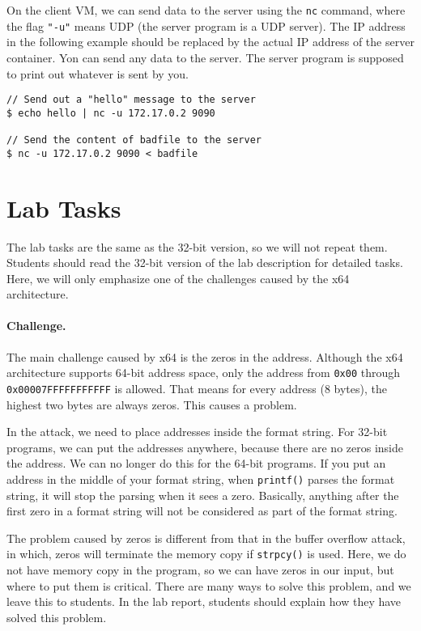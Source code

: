 On the client VM, we can send data to the server using 
the \texttt{nc} command, where the flag \texttt{"-u"} means UDP (the server
program is a UDP server). The IP address in the following example should be 
replaced by the actual IP address of the server container. 
Yon can send any data to the server. The server program is supposed
to print out whatever is sent by you. 


\begin{lstlisting}
// Send out a "hello" message to the server
$ echo hello | nc -u 172.17.0.2 9090 

// Send the content of badfile to the server
$ nc -u 172.17.0.2 9090 < badfile
\end{lstlisting}


 




\section{Lab Tasks}


The lab tasks are the same as the 32-bit version, so we will not 
repeat them. Students should read the 32-bit version of the 
lab description for detailed tasks. Here, we will
only emphasize one of the challenges caused by
the x64 architecture. 


\paragraph{Challenge.} The main challenge caused by x64 is the zeros in the address.
Although the x64 architecture
supports 64-bit address space, only the address from
\texttt{0x00} through \texttt{0x00007FFFFFFFFFFF} is allowed. That means for
every address (8 bytes), the highest two bytes are always zeros.
This causes a problem.

In the attack, we need to place addresses inside the format string. For 
32-bit programs, we can put the addresses anywhere, because there 
are no zeros inside the address. We can no longer do this
for the 64-bit programs. If you put an address in the middle of 
your format string, when \texttt{printf()} parses the 
format string, it will stop the parsing when it sees a zero. Basically,
anything after the first zero in a format string will not 
be considered as part of the format string. 

The problem caused by zeros is different from that
in the buffer overflow attack, in which,
zeros will terminate the memory copy if \texttt{strpcy()} is used. 
Here, we do not have memory copy in the program, 
so we can have zeros in our input, but where to put them
is critical. 
There are many ways to solve this problem, and 
we leave this to students. In the lab report, students
should explain how they have solved this problem. 


